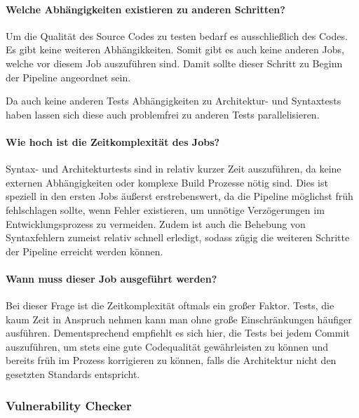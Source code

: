 \paragraph{Welche Abhängigkeiten existieren zu anderen Schritten?}

Um die Qualität des Source Codes zu testen bedarf es ausschließlich des Codes. Es gibt keine weiteren Abhängikkeiten.
Somit gibt es auch keine anderen Jobs, welche vor diesem Job auszuführen sind.
Damit sollte dieser Schritt zu Beginn der Pipeline angeordnet sein.

Da auch keine anderen Tests Abhängigkeiten zu Architektur- und Syntaxtests haben lassen sich diese auch problemfrei zu anderen Tests parallelisieren.

\paragraph{Wie hoch ist die Zeitkomplexität des Jobs?}

Syntax- und Architekturtests sind in relativ kurzer Zeit auszuführen, da keine externen Abhängigkeiten oder komplexe Build Prozesse nötig sind.
Dies ist speziell in den ersten Jobs äußerst erstrebenswert, da die Pipeline möglichst früh fehlschlagen sollte, wenn Fehler existieren, um unnötige Verzögerungen im Entwicklungsprozess zu vermeiden.
Zudem ist auch die Behebung von Syntaxfehlern zumeist relativ schnell erledigt, sodass zügig die weiteren Schritte der Pipeline erreicht werden können.

\paragraph{Wann muss dieser Job ausgeführt werden?}

Bei dieser Frage ist die Zeitkomplexität oftmals ein großer Faktor.
Tests, die kaum Zeit in Anspruch nehmen kann man ohne große Einschränkungen häufiger ausführen.
Dementsprechend empfiehlt es sich hier, die Tests bei jedem Commit auszuführen, um stets eine gute Codequalität gewährleisten zu können und bereits früh im Prozess korrigieren zu können, falls die Architektur nicht den gesetzten Standards entspricht.

\subsubsection{Vulnerability Checker}\label{subsubsec:vulChecker}

